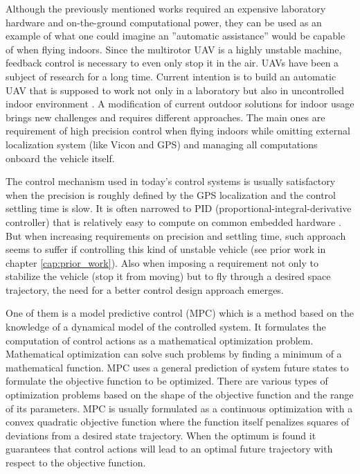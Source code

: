 Although the previously mentioned works required an expensive laboratory hardware and on-the-ground computational power, they can be used as an example of what one could imagine an ''automatic assistance'' would be capable of when flying indoors. Since the multirotor UAV is a highly unstable machine, feedback control is necessary to even only stop it in the air. UAVs have been a subject of research for a long time. Current intention is to build an automatic UAV that is supposed to work not only in a laboratory but also in uncontrolled indoor environment \citep{alexis2014rmpc}. A modification of current outdoor solutions for indoor usage brings new challenges and requires different approaches. The main ones are requirement of high precision control when flying indoors while omitting external localization system (like Vicon and GPS) and managing all computations onboard the vehicle itself.

The control mechanism used in today's control systems is usually satisfactory when the precision is roughly defined by the GPS localization and the control settling time is slow. It is often narrowed to PID (proportional-integral-derivative controller) that is relatively easy to compute on common embedded hardware \cite{pixhawk, ardupilot}. But when increasing requirements on precision and settling time, such approach seems to suffer if controlling this kind of unstable vehicle (see prior work in chapter \ref{cap:prior_work}). Also when imposing a requirement not only to stabilize the vehicle (stop it   from moving) but to fly through a desired space trajectory, the need for a better control design approach emerges.

One of them is a model predictive control (MPC) which is a method based on the knowledge of a dynamical model of the controlled system. It formulates the computation of control actions as a mathematical optimization problem. Mathematical optimization can solve such problems by finding a minimum of a mathematical function. MPC uses a general prediction of system future states to formulate the objective function to be optimized. There are various types of optimization problems based on the shape of the objective function and the range of its parameters. MPC is usually formulated as a continuous optimization with a convex quadratic objective function where the function itself penalizes squares of deviations from a desired state trajectory. When the optimum is found it guarantees that control actions will lead to an optimal future trajectory with respect to the objective function.

